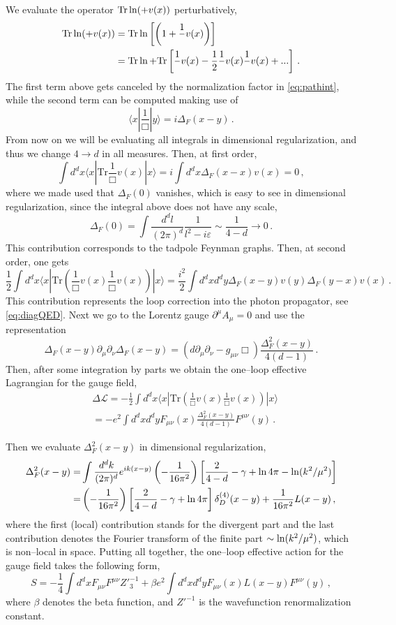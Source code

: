 \documentclass[12pt]{article}
\newcommand{\be}{\begin{equation}}
\newcommand{\ee}{\end{equation}}
\newcommand\m{\mu}
\newcommand\g{\gamma}
\newcommand\n{\nu}
\def\d{\partial}
\renewcommand{\ln}{\mathop{\rm ln}\nolimits}
\begin{document}
We evaluate the operator $\text{Tr}\ln(\Box +v(x))$ perturbatively,
\be
\begin{split}
 \text{Tr}\ln(\Box +v(x))&=\text{Tr}\ln\left[\Box\left( 1+\frac{1}{\Box}v(x)\right)\right]\\
&= \text{Tr}\ln \Box + \text{Tr}\left[\frac{1}{\Box}v(x)-\frac{1}{2}\frac{1}{\Box}v(x)\frac{1}{\Box}v(x)+...\right]\,.
\end{split}
\ee
The first term above gets canceled by the normalization factor in \eqref{eq:pathint},
while the second term can be computed making use of
\be
\langle x| \frac{1}{ \Box}  |y\rangle =i\Delta_F(x-y)\,.
\ee
From now on we will be evaluating all integrals in dimensional regularization, and thus we change $4\to d$ in all measures.
Then, at first order,
\be
\int  d^dx \langle x| \text{Tr}\frac{1}{\Box} v(x) |x \rangle =i\int  d^dx
\Delta_F(x-x)v(x)=0\,,
\ee
where we made used that
$\Delta_F(0)$ vanishes, which is easy to see in dimensional regularization, since the integral above does not have any scale,
\be
\Delta_F(0)=\int \frac{d^dl}{(2\pi)^d}\frac{1}{l^2-i\varepsilon}\sim \frac{1}{4-d}\to 0\,.
\ee
This contribution corresponds to the tadpole Feynman graphs.
Then, at second order, one gets
\be
\frac{1}{2}\int  d^dx \langle x| \text{Tr}
\left(\frac{1}{\Box}v(x)\frac{1}{\Box}v(x)\right) |x \rangle
=\frac{i^2}{2}\int  d^dx d^dy
\Delta_F(x-y)v(y)\Delta_F(y-x)v(x)\,.
\ee
This contribution represents the loop correction
into the photon propagator, see \eqref{eq:diagQED}.
Next we go to the Lorentz gauge $\d^\m A_\mu=0$
and use the representation
\be
\Delta_F(x-y)\d_\mu \d_\nu \Delta_F(x-y)=(d\d_\m \d_\n -g_{\mu \nu}\Box)\frac{\Delta^2_F(x-y)}{4(d-1)} \,.
\ee
Then, after some integration by parts we obtain the one--loop effective Lagrangian for the gauge field,
\be
\label{eq:eact1}
\begin{split}
&\Delta \mathcal{L}=-\frac{1}{2}\int  d^dx \langle x| \text{Tr}
\left(\frac{1}{\Box}v(x)\frac{1}{\Box}v(x)\right)  |x \rangle  \\
&=
-e^2\int d^dx d^dy F_{\m\nu}(x)\frac{\Delta^2_F(x-y)}{4(d-1)}F^{\m\nu}(y)\,.
\end{split}
\ee

Then we evaluate $\Delta^2_F(x-y)$ in dimensional regularization,
\be
\begin{split}
\Delta^2_F(x-y)=&\int \frac{d^d k}{(2\pi)^{d}} e^{ik(x-y)}\left(-\frac{1}{16\pi^2}\right)
\left[\frac{2}{4-d}-\g+\ln 4\pi-\ln (k^2/\mu^2)\right]\\
=&\left(-\frac{1}{16\pi^2}\right)
\left[\frac{2}{4-d}-\g+\ln 4\pi\right]\delta_D^{(4)}(x-y)+\frac{1}{16\pi^2}L(x-y)\,,
\end{split}
\ee
where the first (local) contribution stands for the divergent part and
the last contribution denotes the Fourier transform of the finite part $\sim \ln(k^2/\mu^2)$, which is
non--local in space. Putting all together, the one--loop effective action for
the gauge field takes the following form,
\be
S=-\frac{1}{4}\int d^dx  F_{\mu\nu}F^{\mu\nu}Z'^{-1}_3+\beta e^2 \int d^dx d^dy
F_{\mu \nu}(x)L(x-y)F^{\mu \nu}(y)\,,
\ee
where $\beta$ denotes the beta function, and $Z'^{-1}$ is the wavefunction
renormalization constant.
\end{document}

